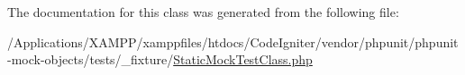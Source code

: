 The documentation for this class was generated from the following file\+:\begin{DoxyCompactItemize}
\item 
/\+Applications/\+X\+A\+M\+P\+P/xamppfiles/htdocs/\+Code\+Igniter/vendor/phpunit/phpunit-\/mock-\/objects/tests/\+\_\+fixture/\mbox{\hyperlink{_static_mock_test_class_8php}{Static\+Mock\+Test\+Class.\+php}}\end{DoxyCompactItemize}
